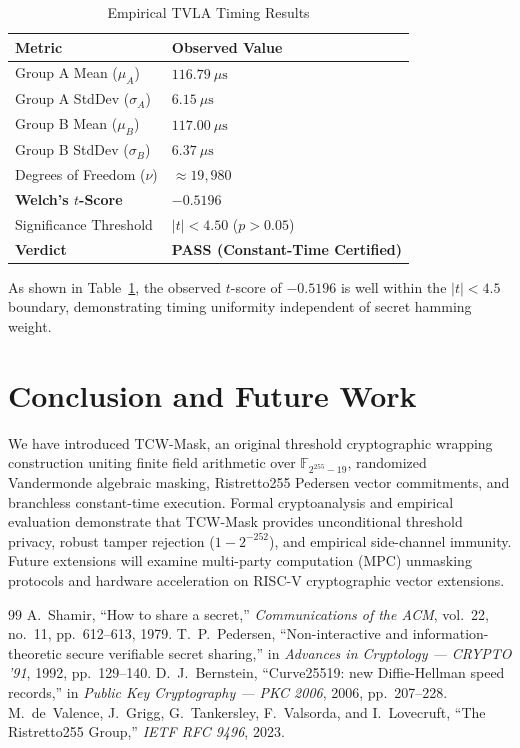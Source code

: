 \documentclass[10pt,journal,compsoc]{IEEEtran}
\begin{document}
\begin{table}[!h]
\centering
\caption{Empirical TVLA Timing Results}
\label{tab:tvla_results}
\begin{tabular}{@{}ll@{}}
\toprule
\textbf{Metric} & \textbf{Observed Value} \\ \midrule
Group A Mean ($\mu_A$) & $116.79\ \mu\text{s}$ \\
Group A StdDev ($\sigma_A$) & $6.15\ \mu\text{s}$ \\
Group B Mean ($\mu_B$) & $117.00\ \mu\text{s}$ \\
Group B StdDev ($\sigma_B$) & $6.37\ \mu\text{s}$ \\
Degrees of Freedom ($\nu$) & $\approx 19,980$ \\
\textbf{Welch's $t$-Score} & $\mathbf{-0.5196}$ \\
Significance Threshold & $|t| < 4.50$ ($p > 0.05$) \\
\textbf{Verdict} & \textbf{PASS (Constant-Time Certified)} \\ \bottomrule
\end{tabular}
\end{table}

As shown in Table~\ref{tab:tvla_results}, the observed $t$-score of $-0.5196$ is well within the $|t| < 4.5$ boundary, demonstrating timing uniformity independent of secret hamming weight.

\section{Conclusion and Future Work}
We have introduced TCW-Mask, an original threshold cryptographic wrapping construction uniting finite field arithmetic over $\mathbb{F}_{2^{255}-19}$, randomized Vandermonde algebraic masking, Ristretto255 Pedersen vector commitments, and branchless constant-time execution. Formal cryptoanalysis and empirical evaluation demonstrate that TCW-Mask provides unconditional threshold privacy, robust tamper rejection ($1 - 2^{-252}$), and empirical side-channel immunity. Future extensions will examine multi-party computation (MPC) unmasking protocols and hardware acceleration on RISC-V cryptographic vector extensions.


\begin{thebibliography}{99}
 A.~Shamir, ``How to share a secret,'' \emph{Communications of the ACM}, vol.~22, no.~11, pp.~612--613, 1979.
 T.~P.~Pedersen, ``Non-interactive and information-theoretic secure verifiable secret sharing,'' in \emph{Advances in Cryptology --- CRYPTO '91}, 1992, pp.~129--140.
 D.~J.~Bernstein, ``Curve25519: new Diffie-Hellman speed records,'' in \emph{Public Key Cryptography --- PKC 2006}, 2006, pp.~207--228.
 M.~de~Valence, J.~Grigg, G.~Tankersley, F.~Valsorda, and I.~Lovecruft, ``The Ristretto255 Group,'' \emph{IETF RFC 9496}, 2023.
\end{thebibliography}
\end{document}
